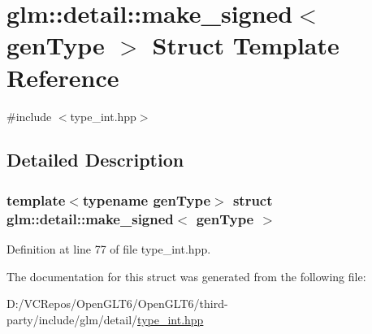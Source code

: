 \hypertarget{structglm_1_1detail_1_1make__signed}{}\section{glm\+::detail\+::make\+\_\+signed$<$ gen\+Type $>$ Struct Template Reference}
\label{structglm_1_1detail_1_1make__signed}


{\ttfamily \#include $<$type\+\_\+int.\+hpp$>$}



\subsection{Detailed Description}
\subsubsection*{template$<$typename gen\+Type$>$\newline
struct glm\+::detail\+::make\+\_\+signed$<$ gen\+Type $>$}



Definition at line 77 of file type\+\_\+int.\+hpp.



The documentation for this struct was generated from the following file\+:\begin{DoxyCompactItemize}
\item 
D\+:/\+V\+C\+Repos/\+Open\+G\+L\+T6/\+Open\+G\+L\+T6/third-\/party/include/glm/detail/\mbox{\hyperlink{type__int_8hpp}{type\+\_\+int.\+hpp}}\end{DoxyCompactItemize}
